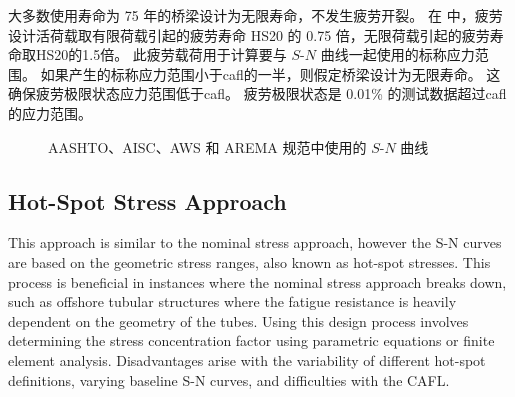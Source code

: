 大多数使用寿命为 75 年的桥梁设计为无限寿命，不发生疲劳开裂。 在 \lrfd 中，疲劳设计活荷载取有限荷载引起的疲劳寿命 HS20 的 0.75 倍，无限荷载引起的疲劳寿命取HS20的1.5倍。 此疲劳载荷用于计算要与 $S$-$N$ 曲线一起使用的标称应力范围。 如果产生的标称应力范围小于\acrlong*{cafl}的一半，则假定桥梁设计为无限寿命。 这确保疲劳极限状态应力范围低于\acrlong*{cafl}。 疲劳极限状态是 0.01\% 的测试数据超过\acrlong*{cafl}的应力范围。\cite{aashto2012l}

\begin{figure}
  \caption{AASHTO、AISC、AWS 和 AREMA 规范中使用的 $S$-$N$ 曲线 \cite{aashto2012l}}
  \label{fig:s-n-curve}
\end{figure}


\subsection{Hot-Spot Stress Approach}
This approach is similar to the nominal stress approach, however the S-N curves are based on the geometric
stress ranges, also known as hot-spot stresses. This process is beneficial in instances where the nominal stress
approach breaks down, such as offshore tubular structures where the fatigue resistance is heavily dependent on the
geometry of the tubes. Using this design process involves determining the stress concentration factor using
parametric equations or finite element analysis. Disadvantages arise with the variability of different hot-spot
definitions, varying baseline S-N curves, and difficulties with the CAFL.

